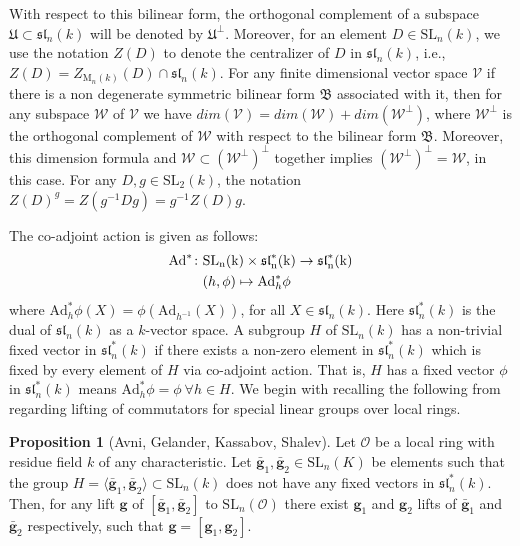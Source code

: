 \documentclass[10pt,twoside]{amsart}
\newcommand{\SL}{\mathrm{SL}}
\newcommand{\M}{\mathrm{M}}
\theoremstyle{definition}
\theoremstyle{definition}
\newtheorem{proposition}[theorem]{Proposition}
\begin{document}
\fi
\noindent With respect to this bilinear form, the orthogonal complement of a subspace $\mathfrak{U} \subset \mathfrak{sl}_n(k)$ will be denoted by $\mathfrak{U}^{\perp}$. Moreover, for an element $D\in \SL_n(k)$, we use the notation $Z(D)$ to denote the centralizer of $D$ in $\mathfrak{sl}_n(k)$, i.e., $Z(D) = Z_{\M_n(k)}(D) \cap \mathfrak{sl}_n(k)$. For any finite dimensional vector space $\mathcal{V}$ if there is a non degenerate symmetric bilinear form $\mathfrak{B}$ associated with it, then for any subspace $\mathcal{W}$ of $\mathcal{V}$ we have $dim(\mathcal{V}) = dim(\mathcal{W}) + dim(\mathcal{W}^{\perp})$, where $\mathcal{W}^{\perp}$ is the orthogonal complement of $\mathcal{W}$ with respect to the bilinear form $\mathfrak{B}$.
Moreover, this dimension formula and $\mathcal{W} \subset (\mathcal{W}^{\perp})^{\perp}$ together implies $(\mathcal{W}^{\perp})^{\perp} = \mathcal{W}$, in this case.
For any $D, g\in \SL_2(k)$, the notation $Z(D)^g = Z(g^{-1}Dg) = g^{-1}Z(D)g$. 


The co-adjoint action is given as follows: 
\begin{eqnarray*}
\mathrm{Ad}^* \colon & \rm{SL}_n(k) \times \mathfrak{sl}_n^*(k) \rightarrow \mathfrak{sl}_n^*(k) \\ & (h, \phi) \mapsto \mathrm{Ad}^*_h\phi
\end{eqnarray*}
where $\mathrm{Ad}^*_{h}\phi(X) = \phi(\mathrm{Ad}_{h^{-1}}(X))$, for all $X\in \mathfrak{sl}_n(k)$. 
Here $\mathfrak{sl}_n^*(k)$  is the dual of $\mathfrak{sl}_n(k)$ as a $k$-vector space. A subgroup $H$ of $\SL_n(k)$ has a non-trivial fixed vector in $\mathfrak{sl}_n^*(k)$ if there exists a non-zero element in $\mathfrak{sl}_n^*(k)$ which is fixed by every element of $H$ via co-adjoint action. That is, $H$ has a fixed vector $\phi$ in $\mathfrak{sl}_n^*(k)$ means $\mathrm{Ad}_h^*\phi = \phi\ \forall h\in H$. We begin with recalling the following from \cite{AvniGelanderKassabovShalev} regarding lifting of commutators for special linear groups over local rings.

\begin{proposition}[Avni, Gelander, Kassabov, Shalev]{\label{adelic 1}}
Let $\mathcal{O}$ be a local ring with residue field $k$ of any characteristic. Let $\mathbf{\bar g}_1, \mathbf{\bar g}_2 \in \SL_n(K)$ be elements such that the group $H = \langle \mathbf{\bar g}_1, \mathbf{\bar g}_2 \rangle \subset \SL_n(k)$ does not have any fixed vectors in $\mathfrak {sl}_n^*(k)$. Then, for any lift $\mathbf{g}$ of $[\mathbf{\bar g}_1, \mathbf{\bar g}_2]$ to $\SL_n(\mathcal O)$ there exist $\mathbf{g}_1$ and $\mathbf{g}_2$ lifts of $\mathbf{\bar g}_1$ and $\mathbf{\bar g}_2$ respectively, such that $\mathbf{g} = [\mathbf{g}_1, \mathbf{g}_2]$.
\end{proposition}
\end{document}
